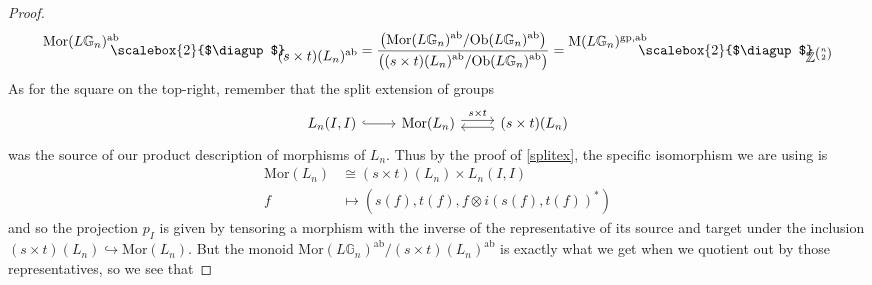 \documentclass{amsbook} %
\newcommand{\MorLn}{\mathrm{Mor}(L_n)}
\newcommand{\bigquotient}[2]{ \raisebox{0.75\height}{$#1$} \mkern-12mu\scalebox{2}{$\diagup$}\mkern-10mu \raisebox{-0.5\height}{$#2$} }
\newcommand{\ab}{\mathrm{ab}}
\newcommand{\gp}{\mathrm{gp}}
\numberwithin{section}{chapter}
\begin{document}
\begin{proof}
  \[
    \bigquotient{\mathrm{Mor}(L\mathbb{G}_{n})^{\ab}}{(s \times t)(L_n)^{\ab}} = \frac{ \displaystyle  \left(\mathrm{Mor}(L\mathbb{G}_{n})^{\ab}/\mathrm{Ob}(L\mathbb{G}_{n})^{\ab} \right)}{ \displaystyle \left( (s \times t)(L_n)^{\ab}/\mathrm{Ob}(L\mathbb{G}_{n})^{\ab} \right)} = \bigquotient{\mathrm{M}(L\mathbb{G}_{n})^{\gp, \ab}}{\mathbb{Z}^{\binom{n}{2}}}
  \]
As for the square on the top-right, remember that the split extension of groups
\[ \begin{tikzcd}
L_n(I,I) \ar[r, hookrightarrow] & \MorLn \ar[r, shift left, "s \times t"] & (s \times t)(L_n) \ar[l, shift left, hookrightarrow, ""]
\end{tikzcd} \]
was the source of our product description of morphisms of $L_n$. Thus by the proof of \cref{splitex}, the specific isomorphism we are using is
  \begin{align*}
    \MorLn &\cong (s \times t)(L_n) \times L_n(I,I) \\
    f &\mapsto \left(s(f), t(f), f \otimes i(s(f),t(f))^{\ast}\right)
  \end{align*}
and so the projection $p_I$ is given by tensoring a morphism with the inverse of the representative of its source and target under the inclusion $(s \times t)(L_n) \hookrightarrow \MorLn$. But the monoid $\mathrm{Mor}(L\mathbb{G}_{n})^{\ab}/(s \times t)(L_n)^{\ab}$ is exactly what we get when we quotient out by those representatives, so we see that

\end{proof}
\end{document}
